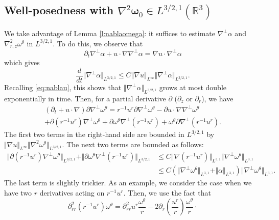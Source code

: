 \documentclass[11pt]{amsart}
\newcommand{\R}{{\mathbb R}}
\numberwithin{equation}{section}
\newcommand{\nrm}[1]{\Vert#1\Vert}
\def\d{\partial}
\newcommand{\nb}{\nabla}
\newcommand{\tht}{\theta}
\newcommand{\omg}{\omega}
\newcommand{\bfomg}{{\boldsymbol{\omega}}}
\begin{document}
	\subsection{Well-posedness with \texorpdfstring{$\nb^2\bfomg_0 \in L^{3/2,1}(\R^3)$}{TEXT}}
	We take advantage of Lemma \ref{l:nablaomega}: it suffices to
	 estimate  $\nb^\perp \alpha$ and $\nabla^2_{r,z}\omg^\tht$ in $L^{3/2,1}.$ To do this, we observe that  \begin{equation*}
					\d_t \nb^\perp \alpha + u\cdot\nb \nb^\perp\alpha =  \nb u \cdot \nb^\perp \alpha
		\end{equation*} which gives 
		\begin{equation*}
			\frac{d}{dt} \nrm{ \nb^\perp \alpha }_{L^{3/2,1}} \le C \nrm{\nb u }_{L^\infty} \nrm{ \nb^\perp \alpha }_{L^{3/2,1}}. 
		\end{equation*}
		 Recalling \eqref{eq:nablau}, this shows that $\nrm{ \nb^\perp \alpha }_{L^{3/2,1}}$  grows at most double exponentially in time. 
	\medbreak
	Then, for a partial derivative $\d$ ($\d_z$ or $\d_r$),  we have\begin{multline*}
	(\d_t+u\cdot\nabla) \d \nb^\perp\omg^{\tht} = r^{-1}u^r \d \nb^\perp\omg^{\tht} - \d u \cdot \nb   \nb^\perp\omg^{\tht} \\+ \d(r^{-1}u^r)  \nb^\perp\omg^{\tht} + \d  \omg^{\tht} \nb^\perp (r^{-1}u^r) +  {\omg^{\tht} \d \nb^\perp( r^{-1} u^{r})} . 
	\end{multline*}
	 The first two terms in the right-hand side are bounded in $L^{3/2,1}$ by $\nrm{\nb u}_{L^{\infty}} \nrm{ \nb^2 \omg^{\tht} }_{L^{3/2,1}}$.  
	\medbreak
	The next two terms are bounded as follows: \begin{align*}
					\nrm{ \d(r^{-1}u^r)  \nb^\perp\omg^{\tht} }_{L^{3/2,1}} + \nrm{ \d  \omg^{\tht} \nb^\perp (r^{-1}u^r) }_{L^{3/2,1}}    &\le C\nrm{ \nb (r^{-1}u^r) }_{L^{3,1 }} \nrm{ \nb^\perp\omg^{\tht} }_{L^{3,1}}\\
					  &\le  C \left(  \nrm{ \nb^\perp\omg^{\tht} }_{L^{3,1}} + \nrm{\alpha}_{L^{3,1}} \right) \nrm{ \nb^\perp\omg^{\tht} }_{L^{3,1}} . 
	\end{align*}	
The last term is slightly trickier. As an example, we consider the case when we have two $r$ derivatives acting on $r^{-1} u^{r}.$
Then, we use the fact that
 \begin{equation*}\d^2_{rr} ( r^{-1} u^{r}) \omg^{\tht} =  \d^2_{rr}u^{r} \frac{\omg^{\tht}}{r} - 2 \d_{r}\left( \frac{u^r}{r} \right) \frac{\omg^{\tht}}{r}\cdotp
		\end{equation*} 
\end{document}
